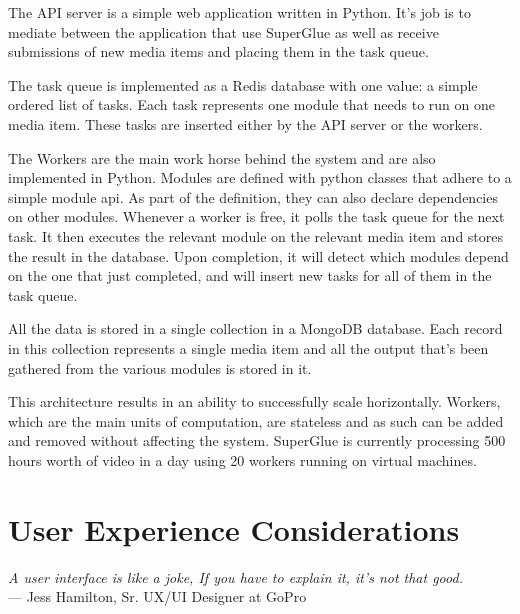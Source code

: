 The API server is a simple web application written in Python. It's job is to mediate between the application that use SuperGlue as well as receive submissions of new media items and placing them in the task queue. 

The task queue is implemented as a Redis database with one value: a simple ordered list of tasks. Each task represents one module that needs to run on one media item. These tasks are inserted either by the API server or the workers. 

The Workers are the main work horse behind the system and are also implemented in Python. Modules are defined with python classes that adhere to a simple module api. As part of the definition, they can also declare dependencies on other modules. Whenever a worker is free, it polls the task queue for the next task. It then executes the relevant module on the relevant media item and stores the result in the database. Upon completion, it will detect which modules depend on the one that just completed, and will insert new tasks for all of them in the task queue. 


All the data is stored in a single collection in a MongoDB database. Each record in this collection represents a single media item and all the output that's been gathered from the various modules is stored in it. 

This architecture results in an ability to successfully scale horizontally. Workers, which are the main units of computation, are stateless and as such can be added and removed without affecting the system. SuperGlue is currently processing 500 hours worth of video in a day using 20 workers running on virtual machines.

\section{User Experience Considerations} 





\begin{flushright}{ \slshape    
    A user interface is like a joke, If you have to explain it, it's not that good.
    } \\ \medskip
    --- Jess Hamilton, Sr. UX/UI Designer at GoPro
\end{flushright}


